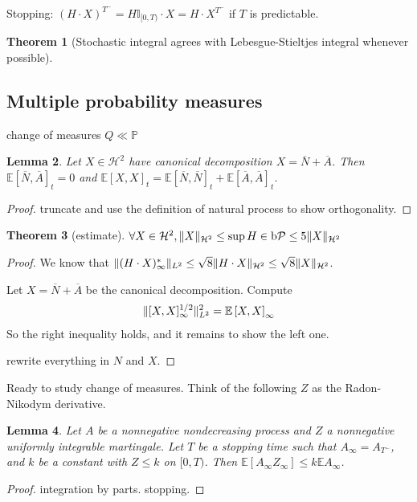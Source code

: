 \documentclass[openany,oneside]{book}
\newtheorem{thm}{Theorem}[section]
\newtheorem{lem}[thm]{Lemma}
\theoremstyle{definition}
\theoremstyle{remark}
\newcommand{\E}{\mathbb{E}} %
\renewcommand{\P}{\mathbb{P}} %
\newcommand{\I}{\mathbb{I}} %
\DeclarePairedDelimiter{\norm}{\lVert}{\rVert} %
\newcommand{\sH}[1][2]{\mathcal{H}^{#1}} %
\newcommand{\pred}{\mathcal{P}} %
\newcommand{\bP}{\mathrm{b}\pred} %
\begin{document}
Stopping: $(H\cdot X)^{T^-} = H\I_{[0,T)}\cdot X = H\cdot X^{T^-}$ if $T$ is predictable.

\par
\begin{thm}[Stochastic integral agrees with Lebesgue-Stieltjes integral whenever possible]
\end{thm}

\subsection{Multiple probability measures}
change of measures $Q \ll \P$

\begin{lem}
Let $X\in \sH$ have canonical decomposition $X=\overline{N}+\overline{A}$. Then $\E\left[\overline{N},\overline{A}\right]_t = 0$ and $\E\left[X,X\right]_t = \E\left[\overline{N},\overline{N}\right]_t + \E\left[\overline{A},\overline{A}\right]_t$.
\end{lem}
\begin{proof}
truncate and use the definition of natural process to show orthogonality.
\end{proof}

\begin{thm}[estimate]
$\forall X\in \sH, \norm{X}_{\sH} \le \sup{H\in\bP} \le 5\norm{X}_{\sH}$
\end{thm}
\begin{proof}
We know that $\norm{(H\cdot X)^\ast_\infty}_{L^2} \le \sqrt{8} \norm{H\cdot X}_{\sH} \le \sqrt{8}\norm{X}_{\sH}$.
\par
Let $X=\overline{N}+\overline{A}$ be the canonical decomposition. Compute
\begin{align*}
\norm{[X,X]^{1/2}_\infty}^2_{L^2} &= \E\left[X,X\right]_\infty \\
\end{align*}
So the right inequality holds, and it remains to show the left one.
\par
rewrite everything in $N$ and $X$.
\end{proof}

Ready to study change of measures. Think of the following $Z$ as the Radon-Nikodym derivative.
\begin{lem}
Let $A$ be a nonnegative nondecreasing process and $Z$ a nonnegative uniformly integrable martingale. Let $T$ be a stopping time such that $A_\infty = A_{T^-}$, and $k$ be a constant with $Z\le k$ on $[0,T)$. Then $\E[A_\infty Z_\infty] \le k \E A_\infty$.
\end{lem}
\begin{proof}
integration by parts. stopping.
\end{proof}
\end{document}
